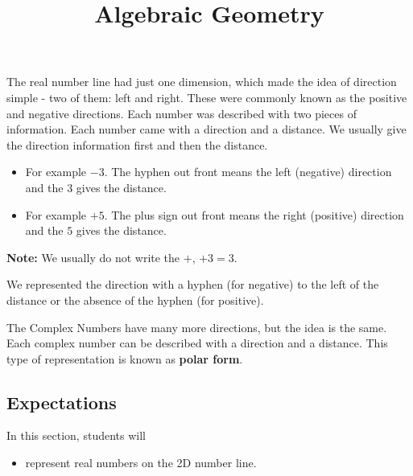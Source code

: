 \documentclass{ximera}
\title{Algebraic Geometry}
\begin{document}
\begin{abstract}
\end{abstract}
\maketitle





The real number line had just one dimension, which made the idea of direction simple - two of them: left and right.  These were commonly known as the positive and negative directions.  Each number was described with two pieces of information.  Each number came with a direction and a distance.  We usually give the direction information first and then the distance.


\begin{itemize}
\item For example $-3$.  The hyphen out front means the left (negative) direction and the $3$ gives the distance.
\item For example $+5$.  The plus sign out front means the right (positive) direction and the $5$ gives the distance.
\end{itemize}
\textbf{Note:} We usually do not write the $+$, $+3 = 3$.

We represented the direction with a hyphen (for negative) to the left of the distance or the absence of the hyphen (for positive).

The Complex Numbers have many more directions, but the idea is the same.  Each complex number can be described with a direction and a distance.  This type of representation is known as \textbf{polar form}.






\subsection{Expectations}



\begin{sectionOutcomes}
In this section, students will 

\begin{itemize}
\item represent real numbers on the 2D number line.
\end{itemize}
\end{sectionOutcomes}
\end{document}
